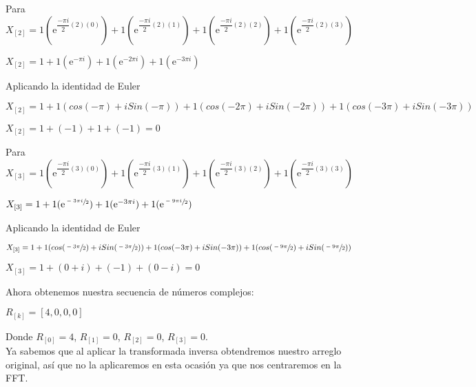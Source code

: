 \documentclass[a4paper]{article}
\begin{document}
Para $X_{[2]} = 1(\mathrm{e}^{\dfrac{-\pi i}{2}(2)(0)}) + 1(\mathrm{e}^{\dfrac{-\pi i}{2}(2)(1)}) + 1(\mathrm{e}^{\dfrac{-\pi i}{2}(2)(2)}) + 1(\mathrm{e}^{\dfrac{-\pi i}{2}(2)(3)})$

\begin{center}
$X_{[2]} = 1 + 1(\mathrm{e}^{-\pi i}) + 1(\mathrm{e}^{-2\pi i}) + 1(\mathrm{e}^{-3\pi i})$
\end{center}

Aplicando la identidad de Euler

\begin{center}
$X_{[2]} = 1 + 1(cos(-\pi) + i Sin(-\pi)) + 1(cos(-2\pi) + i Sin(-2\pi)) + 1(cos(-3\pi) + i Sin(-3\pi))$
\end{center}

\begin{center}
$X_{[2]} = 1 + (-1) + 1 + (-1) = 0$
\end{center}

Para $X_{[3]} = 1(\mathrm{e}^{\dfrac{-\pi i}{2}(3)(0)}) + 1(\mathrm{e}^{\dfrac{-\pi i}{2}(3)(1)}) + 1(\mathrm{e}^{\dfrac{-\pi i}{2}(3)(2)}) + 1(\mathrm{e}^{\dfrac{-\pi i}{2}(3)(3)})$

\begin{center}
$X_{[3]} = 1 + 1(\mathrm{e}^{\sfrac{-3\pi i}{2}}) + 1(\mathrm{e}^{-3\pi i}) + 1(\mathrm{e}^{\sfrac{-9\pi i}{2}})$
\end{center}

Aplicando la identidad de Euler

\begin{center}
$X_{[3]} = 1 + 1(cos(\sfrac{-3\pi}{2}) + i Sin(\sfrac{-3\pi}{2})) + 1(cos(-3\pi) + i Sin(-3\pi)) + 1(cos(\sfrac{-9\pi}{2}) + i Sin(\sfrac{-9\pi}{2}))$
\end{center}

\begin{center}
$X_{[3]} = 1 + (0+i) + (-1) + (0-i) = 0$
\end{center}

Ahora obtenemos nuestra secuencia de números complejos:

\begin{center}
$R_{[k]} = [4,0,0,0]$
\end{center}

Donde $R_{[0]} = 4$, $R_{[1]} = 0$, $R_{[2]} = 0$, $R_{[3]} = 0$.\\

Ya sabemos que al aplicar la transformada inversa obtendremos nuestro arreglo original, así que no la aplicaremos en esta ocasión ya que nos centraremos en la FFT.
\end{document}

